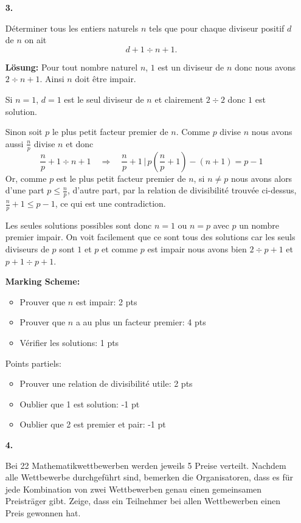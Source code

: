 \documentclass[language=german,style=solution]{smo}
\begin{document}
\begin{enumerate}
\newpage

\item[\textbf{3.}]

Déterminer tous les entiers naturels $n$ tels que pour chaque diviseur positif $d$ de $n$ on ait 
\[
d+1 \div n+1.
\]

\textbf{Lösung:}
Pour tout nombre naturel $n$, $1$ est un diviseur de $n$ donc nous avons $2 \div n+1$. Ainsi $n$ doit être impair.

Si $n=1$, $d = 1$ est le seul diviseur de $n$ et clairement $2 \div 2$ donc $1$ est solution.

Sinon soit $p$ le plus petit facteur premier de $n$. Comme $p$ divise $n$ nous avons aussi $\frac{n}{p}$ divise $n$ et donc 
\[
\frac{n}{p}+1 \div n+1\quad \Rightarrow\quad \frac{n}{p}+1 \,\Big|\, p\left(\frac{n}{p}+1\right) - (n+1) = p-1
\]
Or, comme $p$ est le plus petit facteur premier de $n$, si $n\neq p$ nous avons alors d'une part $p\leq \frac{n}{p}$, d'autre part, par la relation de divisibilité trouvée ci-dessus, $\frac{n}{p}+1\leq p-1$, ce qui est une contradiction.

Les seules solutions possibles sont donc $n=1$ ou $n = p$ avec $p$ un nombre premier impair. On voit facilement que ce sont tous des solutions car les seuls diviseurs de $p$ sont $1$ et $p$ et comme $p$ est impair nous avons bien $2 \div p+1$ et $p+1 \div p+1$.

\textbf{Marking Scheme:}

\begin{itemize}
\item Prouver que $n$ est impair: 2 pts
\item Prouver que $n$ a au plus un facteur premier: 4 pts
\item Vérifier les solutions: 1 pts
\end{itemize}
Points partiels:
\begin{itemize}
\item Prouver une relation de divisibilité utile: 2 pts
\item Oublier que 1 est solution: -1 pt
\item Oublier que 2 est premier et pair: -1 pt
\end{itemize}

\newpage

\item[\textbf{4.}] 

Bei 22 Mathematikwettbewerben werden jeweils 5 Preise verteilt. Nachdem alle Wettbewerbe durchgeführt sind, bemerken die Organisatoren, dass es für jede Kombination von zwei Wett\-bewer\-ben genau einen gemeinsamen Preisträger gibt. Zeige, dass ein Teilnehmer bei allen Wettbe\-wer\-ben einen Preis gewonnen hat.


\end{enumerate}
\end{document}
